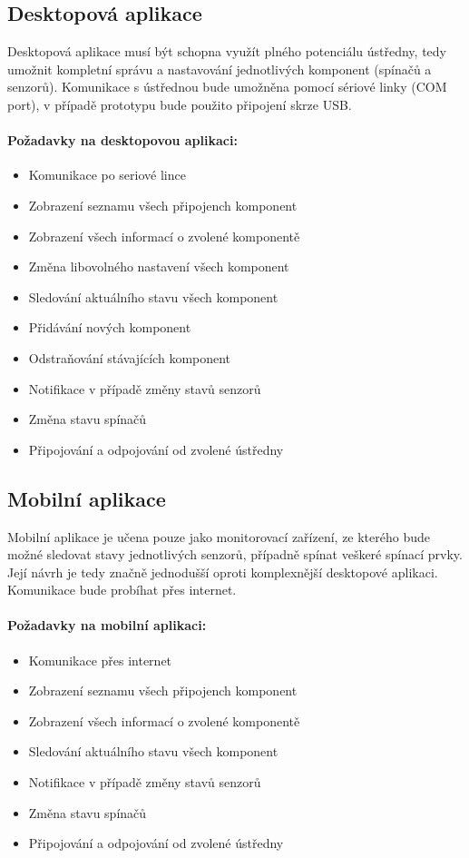 \documentclass[FM,DP]{tulthesis}  %
\begin{document}
\subsection{Desktopová aplikace}
Desktopová aplikace musí být schopna využít plného potenciálu ústředny, tedy umožnit kompletní správu a nastavování jednotlivých komponent (spínačů a senzorů). Komunikace s ústřednou bude umožněna pomocí sériové linky (COM port), v případě prototypu bude použito připojení skrze USB.

\paragraph{Požadavky na desktopovou aplikaci:}
\begin{itemize}
\item Komunikace po seriové lince
\item Zobrazení seznamu všech připojench komponent
\item Zobrazení všech informací o zvolené komponentě
\item Změna libovolného nastavení všech komponent
\item Sledování aktuálního stavu všech komponent
\item Přidávání nových komponent
\item Odstraňování stávajících komponent
\item Notifikace v případě změny stavů senzorů
\item Změna stavu spínačů
\item Připojování a odpojování od zvolené ústředny
\end{itemize}

\subsection{Mobilní aplikace}
Mobilní aplikace je učena pouze jako monitorovací zařízení, ze kterého bude možné sledovat stavy jednotlivých senzorů, případně spínat veškeré spínací prvky. Její návrh je tedy značně jednodušší oproti komplexnější desktopové aplikaci. Komunikace bude probíhat přes internet.

\paragraph{Požadavky na mobilní aplikaci:}
\begin{itemize}
\item Komunikace přes internet
\item Zobrazení seznamu všech připojench komponent
\item Zobrazení všech informací o zvolené komponentě
\item Sledování aktuálního stavu všech komponent
\item Notifikace v případě změny stavů senzorů
\item Změna stavu spínačů
\item Připojování a odpojování od zvolené ústředny
\end{itemize}
\end{document}
